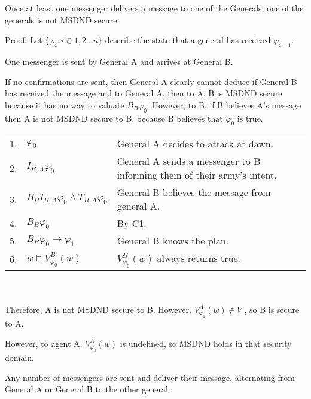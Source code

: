 \begin{thm}
Once at least one messenger delivers a message to one of the Generals, one of the generals is not MSDND secure.
\end{thm}

Proof:
Let $\{ \varphi_i : i \in 1,2 ... n \}$ describe the state that a general has received $\varphi_{i-1}$.

\begin{case}
One messenger is sent by General A and arrives at General B.
\label{case:generalsn0}
\end{case}

If no confirmations are sent, then General A clearly cannot deduce if General B has received the message and to General A, then to A, B is MSDND secure because it has no way to valuate $B_B \varphi_0$. However, to B, if B believes A's message then A is not MSDND secure to B, because B believes that $\varphi_0$ is true.

\begin{table}[h!]
\centering
\small
\begin{tabularx}{\linewidth}{l l X}
1. & $\varphi_0$ & General A decides to attack at dawn. \\
2. & $I_{B,A} \varphi_0$ & General A sends a messenger to B informing them of their army's intent. \\
3. & $B_{B}I_{B,A} \varphi_0 \wedge T_{B,A} \varphi_0$ & General B believes the message from general A. \\
4. & $B_{B} \varphi_0$ & By C1. \\
5. & $B_{B} \varphi_0 \rightarrow \varphi_1$ & General B knows the plan. \\
6. & $w \vDash V_{\varphi_0}^{B}(w)$ & $V_{\varphi_0}^{B}(w)$ always returns true. \\
\end{tabularx} \\~\\
Therefore, A is not MSDND secure to B. However, $V_{\varphi_1}^{A}(w) \not \in V$ , so B is secure to A.
\label{tab:twoarmiesproof}
\end{table}

However, to agent A, $V_{\varphi_{0}}^A(w)$ is undefined, so MSDND holds in that security domain. 

\begin{case}
Any number of messengers are sent and deliver their message, alternating from General A or General B to the other general. \label{case:generalsnn}
\end{case}

